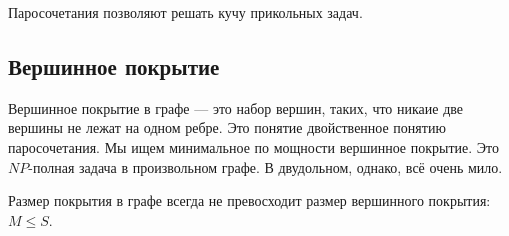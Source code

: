 Паросочетания позволяют решать кучу прикольных задач.

\subsection{Вершинное покрытие}
Вершинное покрытие в графе --- это набор вершин, таких, что никаие две вершины не лежат на одном ребре.
Это понятие двойственное понятию паросочетания.
Мы ищем минимальное по мощности вершинное покрытие. 
Это $NP$-полная задача в произвольном графе.
В двудольном, однако, всё очень мило.

Размер покрытия в графе всегда не превосходит размер вершинного покрытия: $M \leqslant S$.

